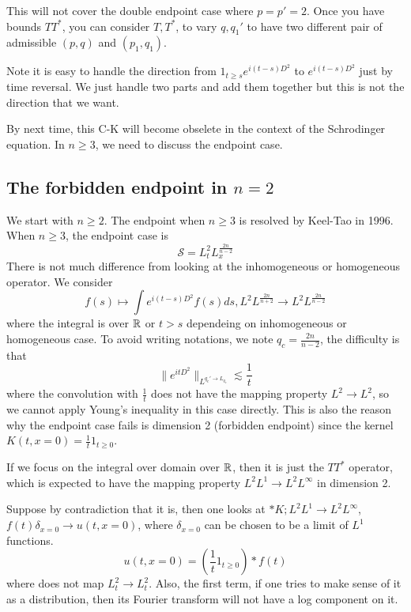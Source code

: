 This will not cover the double endpoint case where $p=p'=2$. Once you have bounds $TT^*$, you can consider $T,T^*$, to vary $q, q_1'$ to have two different pair of admissible $(p,q)$ and $(p_1, q_1)$. 

Note it is easy to handle the direction from $1_{t\geq s}e^{i(t-s)D^2}$ to $e^{i(t-s)D^2}$ just by time reversal. We just handle two parts and add them together but this is not the direction that we want.

By next time, this C-K will become obselete in the context of the Schrodinger equation. In $n\geq 3$, we need to discuss the endpoint case.

\subsection{The forbidden endpoint in $n=2$}
We start with $n\geq 2$. The endpoint when $n\geq 3$ is resolved by Keel-Tao in 1996. When $n\geq 3$, the endpoint case is
\begin{equation*}
    \mathcal{S}=L_t^2L_x^\frac{2n}{n-2}
\end{equation*}
There is not much difference from looking at the inhomogeneous or homogeneous operator. We consider
\begin{equation*}
    f(s)\mapsto \int e^{i(t-s)D^2}f(s)ds, L^2L^\frac{2n}{n+2}\to L^2L^\frac{2n}{n-2}
\end{equation*}
where the integral is over $\mathbb{R}$ or $t>s$ dependeing on inhomogeneous or homogeneous case. To avoid writing notations, we note $q_c=\frac{2n}{n-2}$, the difficulty is that
\begin{equation*}
    \|e^{it D^2}\|_{L^{q_c'\to L_{q_c}}}\lesssim\frac{1}{t}
\end{equation*}
where the convolution with $\frac{1}{t}$ does not have the mapping property $L^2\to L^2$, so we cannot apply Young's inequality in this case directly. This is also the reason why the endpoint case fails is dimension 2 (forbidden endpoint) since the kernel $K(t,x=0)=\frac{1}{t}1_{t\geq 0}$.

If we focus on the integral over domain over $\mathbb{R}$, then it is just the $TT^*$ operator, which is expected to have the mapping property $L^2L^1\to L^2L^\infty$ in dimension 2.

Suppose by contradiction that it is, then one looks at $*K; L^2L^1\to L^2L^\infty$, $f(t)\delta_{x=0}\to u(t,x=0)$, where $\delta_{x=0}$ can be chosen to be a limit of $L^1$ functions.
\begin{equation*}
    u(t,x=0)=\left(\frac{1}{t}1_{t\geq 0} \right)\ast f(t)
\end{equation*}
where does not map $L_t^2\to L_t^2$. Also, the first term, if one tries to make sense of it as a distribution, then its Fourier transform will not have a log component on it.

